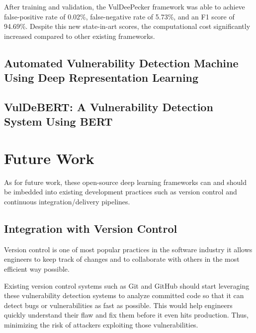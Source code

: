 \documentclass[12pt,twocolumn,letterpaper]{article}
\begin{document}
After training and validation, the VulDeePecker framework was able to achieve false-positive rate of 
0.02\%, false-negative rate of 5.73\%, and an F1 score of 94.69\%. Despite this new state-in-art scores, 
the computational cost significantly increased compared to other existing frameworks.

\subsection{Automated Vulnerability Detection Machine Using Deep Representation Learning}
\label{sub:automated-vulnerability-detection-machine-using-deep-representation-learning}

\cite{Russell18}

\subsection{VulDeBERT: A Vulnerability Detection System Using BERT}
\label{sub:vuldebert}

\cite{Kim22}

\section{Future Work}
\label{sec:future-work}

As for future work, these open-source deep learning frameworks can and should be imbedded into existing 
development practices such as version control and continuous integration/delivery pipelines.

\subsection{Integration with Version Control}
\label{sub:integrating-with-version-control}

Version control is one of most popular practices in the software industry it allows engineers to keep track 
of changes and to collaborate with others in the most efficient way possible. 

Existing version control systems such as Git \cite{Torvalds05} and GitHub \cite{Werner08} should start leveraging these vulnerability 
detection systems to analyze committed code so that it can detect bugs or vulnerabilities as fast as 
possible. This would help engineers quickly understand their flaw and fix them before it even hits production.
Thus, minimizing the risk of attackers exploiting those vulnerabilities.
\end{document}

